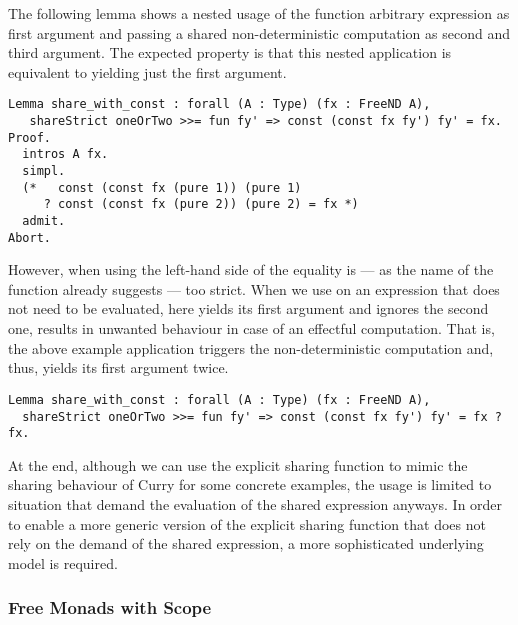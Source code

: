 The following lemma shows a nested usage of the function  arbitrary expression as first argument and passing a shared non-deterministic computation as second and third argument.
The expected property is that this nested application is equivalent to yielding just the first argument.

\begin{verbatim}
Lemma share_with_const : forall (A : Type) (fx : FreeND A),
   shareStrict oneOrTwo >>= fun fy' => const (const fx fy') fy' = fx.
Proof.
  intros A fx.
  simpl.
  (*   const (const fx (pure 1)) (pure 1)
     ? const (const fx (pure 2)) (pure 2) = fx *)
  admit.
Abort.
\end{verbatim}

However, when using  the left-hand side of the equality is --- as the name of the function already suggests --- too strict.
When we use  on an expression that does not need to be evaluated, here  yields its first argument and ignores the second one, results in unwanted behaviour in case of an effectful computation.
That is, the above example application triggers the non-deterministic computation  and, thus, yields its first argument  twice.

\begin{verbatim}
Lemma share_with_const : forall (A : Type) (fx : FreeND A),
  shareStrict oneOrTwo >>= fun fy' => const (const fx fy') fy' = fx ? fx.
\end{verbatim}

At the end, although we can use the explicit sharing function  to mimic the sharing behaviour of Curry for some concrete examples, the usage is limited to situation that demand the evaluation of the shared expression anyways.
In order to enable a more generic version of the explicit sharing function that does not rely on the demand of the shared expression, a more sophisticated underlying model is required.

\subsubsection{Free Monads with Scope}

